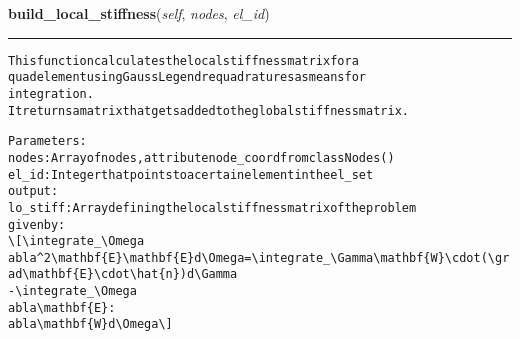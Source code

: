     \vspace{0.5ex}

\hspace{.8\funcindent}\begin{boxedminipage}{\funcwidth}

    \raggedright \textbf{build\_local\_stiffness}(\textit{self}, \textit{nodes}, \textit{el\_id})

    \vspace{-1.5ex}

    \rule{\textwidth}{0.5\fboxrule}
\setlength{\parskip}{2ex}
\begin{alltt}

         This function calculates the local stiffness matrix for a 
         quad element using Gauss Legendre   quadratures as means for 
         integration.
         It returns a matrix that gets added to the global stiffness matrix.
        
        Parameters:
            nodes:  Array of nodes, attribute node\_coord from class Nodes()
            el\_id: Integer that points to a certain element in the el\_set
        output: 
            lo\_stiff: Array defining the local stiffness matrix of the problem
                    given by:
                        {\textbackslash}[{\textbackslash}integrate\_{\textbackslash}Omega
abla{\textasciicircum}2{\textbackslash}mathbf\{E\} {\textbackslash}mathbf\{E\} d{\textbackslash}Omega = {\textbackslash}integrate\_{\textbackslash}Gamma {\textbackslash}mathbf\{W\}{\textbackslash}cdot ({\textbackslash}grad{\textbackslash}mathbf\{E\}{\textbackslash}cdot {\textbackslash}hat\{n\})d{\textbackslash}Gamma
                        - {\textbackslash}integrate\_{\textbackslash}Omega 
abla{\textbackslash}mathbf\{E\} : 
abla{\textbackslash}mathbf\{W\} d{\textbackslash}Omega  {\textbackslash}]
        
\end{alltt}

\setlength{\parskip}{1ex}
    \end{boxedminipage}

    \label{Classes:Quadrilaterals:extract_el_points}

    \vspace{0.5ex}

